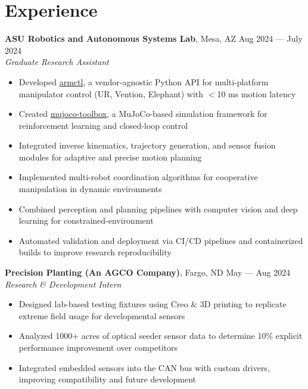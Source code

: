 \documentclass[10pt]{article}
\begin{document}
\section*{Experience}
\textbf{ASU Robotics and Autonomous Systems Lab}, Mesa, AZ \hfill Aug 2024 --- July 2024 \\
\textit{Graduate Research Assistant}
\begin{itemize}
  \item Developed \href{https://github.com/MGross21/armctl}{armctl}, a vendor-agnostic Python API for multi-platform manipulator control (UR, Vention, Elephant) with $<$10 ms motion latency
  \item Created \href{https://github.com/MGross21/mujoco-toolbox}{mujoco-toolbox}, a MuJoCo-based simulation framework for reinforcement learning and closed-loop control
  \item Integrated inverse kinematics, trajectory generation, and sensor fusion modules for adaptive and precise motion planning
  \item Implemented multi-robot coordination algorithms for cooperative manipulation in dynamic environments
  \item Combined perception and planning pipelines with computer vision and deep learning for constrained-environment
  \item Automated validation and deployment via CI/CD pipelines and containerized builds to improve research reproducibility
\end{itemize}
\vspace{0.5em}
\textbf{Precision Planting (An AGCO Company)}, Fargo, ND \hfill May --- Aug 2024 \\
\textit{Research \& Development Intern}
\begin{itemize}
  \item Designed lab-based testing fixtures using Creo \& 3D printing to replicate extreme field usage for developmental sensors
  \item Analyzed 1000+ acres of optical seeder sensor data to determine 10\% explicit performance improvement over competitors
  \item Integrated embedded sensors into the CAN bus with custom drivers, improving compatibility and future development
\end{itemize}
\end{document}
